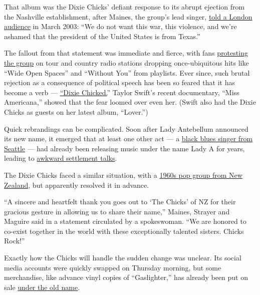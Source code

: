 That album was the Dixie Chicks' defiant response to its abrupt ejection
from the Nashville establishment, after Maines, the group's lead singer,
\href{https://www.nytimes3xbfgragh.onion/2006/05/21/arts/music/21pare.html}{told
a London audience} in March 2003: ``We do not want this war, this
violence, and we're ashamed that the president of the United States is
from Texas.''

The fallout from that statement was immediate and fierce, with fans
\href{https://www.youtube.com/watch?v=nQ8WzYc32JQ}{protesting the group}
on tour and country radio stations dropping once-ubiquitous hits like
``Wide Open Spaces'' and ``Without You'' from playlists. Ever since,
such brutal rejection as a consequence of political speech has been so
feared that it has become a verb ---
\href{https://www.billboard.com/articles/columns/country/7685038/country-music-politics}{``Dixie
Chicked.}'' Taylor Swift's recent documentary, ``Miss Americana,''
showed that the fear loomed over even her. (Swift also had the Dixie
Chicks as guests on her latest album, ``Lover.'')

Quick rebrandings can be complicated. Soon after Lady Antebellum
announced its new name, it emerged that at least one other act --- a
\href{https://www.rollingstone.com/pro/news/lady-antebellum-lady-a-country-blues-1013919/}{black
blues singer from Seattle} --- had already been releasing music under
the name Lady A for years, leading to
\href{https://www.newsday.com/entertainment/music/lady-antebellum-lady-a-1.45795425}{awkward
settlement talks}.

The Dixie Chicks faced a similar situation, with a
\href{https://www.noted.co.nz/culture/culture-music/the-chicks-the-girls-next-door-who-became-kiwi-music-royalty}{1960s
pop group from New Zealand}, but apparently resolved it in advance.

``A sincere and heartfelt thank you goes out to `The Chicks' of NZ for
their gracious gesture in allowing us to share their name,'' Maines,
Strayer and Maguire said in a statement circulated by a spokeswoman.
``We are honored to co-exist together in the world with these
exceptionally talented sisters. Chicks Rock!''

Exactly how the Chicks will handle the sudden change was unclear. Its
social media accounts were quickly swapped on Thursday morning, but some
merchandise, like advance vinyl copies of ``Gaslighter,'' has already
been put on sale
\href{https://www.target.com/p/dixie-chicks-gaslighter-target-exclusive-vinyl/-/A-79694783}{under
the old name}.

